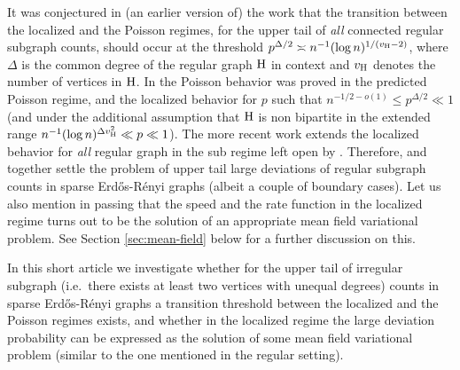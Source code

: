 \documentclass[a4paper,11pt,english,reqno]{amsart}
\numberwithin{equation}{section}
\newcommand{\uH}{\textup{H}}
\begin{document}
	
	It was conjectured in (an earlier version of) the work \cite{HMS} that the transition between the localized and the Poisson regimes, for the upper tail of {\em all} connected regular subgraph counts, should occur at the threshold $p^{\Delta/2} \asymp n^{-1} (\log n)^{1/(v_\uH-2)}$, where $\Delta$ is the common degree of the regular graph $\uH$ in context and $v_\uH$ denotes the number of vertices in $\uH$. In \cite{HMS} the Poisson behavior was proved in the predicted Poisson regime, and the localized behavior for $p$ such that $ n^{-1/2-o(1)} \le p^{\Delta/2} \ll 1$ (and under the additional assumption that $\uH$ is non bipartite in the extended range $n^{-1} (\log n)^{\Delta v_\uH^2} \ll p \ll 1$).   
	The more recent work \cite{ABRB} extends the localized behavior for {\em all} regular graph in the sub regime left open by \cite{HMS}. Therefore, \cite{HMS} and \cite{ABRB} together settle the problem of upper tail large deviations of regular subgraph counts in sparse Erd\H{o}s-R\'enyi graphs (albeit a couple of boundary cases). Let us also mention in passing that the speed and the rate function in the localized regime turns out to be the solution of an appropriate mean field variational problem. See Section \ref{sec:mean-field} below for a further discussion on this. 
	
	
	In this short article we investigate whether for the upper tail of irregular subgraph (i.e.~there exists at least two vertices with unequal degrees) counts in sparse Erd\H{o}s-R\'enyi graphs a transition threshold between the localized and the Poisson regimes exists, and whether in the localized regime the large deviation probability can be expressed as the solution of some mean field variational problem (similar to the one mentioned in the regular setting). %
	
	
	
	
\end{document}
